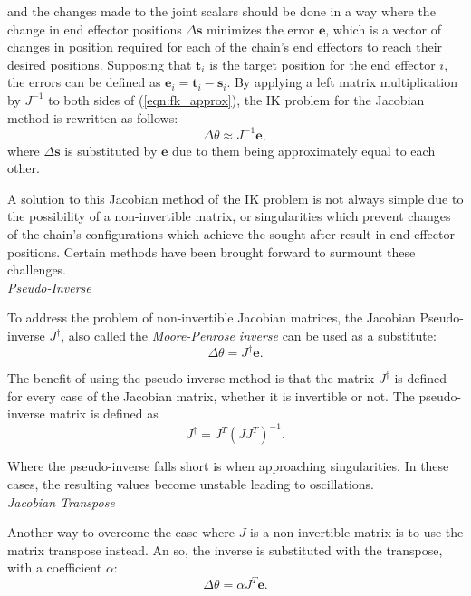 \noindent and the changes made to the joint scalars should be done in a way
where the change in end effector positions \(\Delta\mathbf{s}\) minimizes the
error \(\mathbf{e}\), which is a vector of changes in position required for each
of the chain's end effectors to reach their desired positions. Supposing that
\(\mathbf{t}_i\) is the target position for the end effector \(i\), the errors
can be defined as \(\mathbf{e}_i = \mathbf{t}_i - \mathbf{s}_i\). By applying a left
matrix multiplication by \(J^{-1}\) to both sides of (\ref{eqn:fk_approx}), the
IK problem for the Jacobian method is rewritten as follows: 
\begin{equation} 
    \Delta \theta \approx J^{-1}\mathbf{e},
\end{equation}
\noindent where \(\Delta\mathbf{s}\) is substituted by \(\mathbf{e}\) due to
them being approximately equal to each other.

A solution to this Jacobian method of the IK problem is not always simple due to
the possibility of a non-invertible matrix, or singularities which prevent
changes of the chain's configurations which achieve the sought-after result in
end effector positions. Certain methods have been brought forward to surmount
these challenges. \\

\noindent\textit{Pseudo-Inverse}

To address the problem of non-invertible Jacobian matrices, the Jacobian
Pseudo-inverse \(J^\dagger\), also called the \textit{Moore-Penrose inverse}
\cite{golub_matrix3} can be used as
a substitute:
\begin{equation}
    \Delta \theta = J^{\dagger}\mathbf{e}.
\end{equation}

The benefit of using the pseudo-inverse method is that the matrix \(J^\dagger\)
is defined for every case of the Jacobian matrix, whether it is invertible or
not. The pseudo-inverse matrix is defined as
\begin{equation}
    J^\dagger = J^T (J J^T)^{-1}.
\end{equation}

Where the pseudo-inverse falls short is when approaching singularities. In these
cases, the resulting values become unstable leading to oscillations. \\

\noindent\textit{Jacobian Transpose}

Another way to overcome the case where \(J\) is a non-invertible matrix is to
use the matrix transpose instead. An so, the inverse is substituted with the
transpose, with a coefficient \(\alpha\):
\begin{equation}
    \Delta \theta = \alpha J^T \mathbf{e}.
\end{equation}

